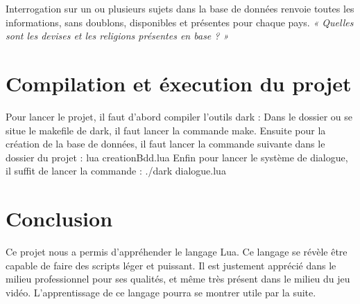 \documentclass[11pt,a4paper]{article}
\begin{document}
Interrogation sur un ou plusieurs sujets dans la base de données renvoie toutes les informations, sans doublons, disponibles et présentes pour chaque pays.
\textit{« Quelles sont les devises et les religions présentes en base ? »}


\section{Compilation et éxecution du projet}
Pour lancer le projet, il faut d'abord compiler l'outils dark :
Dans le dossier ou se situe le makefile de dark, il faut lancer la commande make.
Ensuite pour la création de la base de données, il faut lancer la commande suivante dans le dossier du projet :
lua creationBdd.lua
Enfin pour lancer le système de dialogue, il suffit de lancer la commande :
./dark dialogue.lua

\section{Conclusion}

Ce projet nous a permis d'appréhender le langage Lua. Ce langage se révèle être capable de faire des scripts léger et puissant. Il est justement apprécié dans le milieu professionnel pour ses qualités, et même très présent dans le milieu du jeu vidéo. L'apprentissage de ce langage pourra se montrer utile par la suite.
\end{document}
